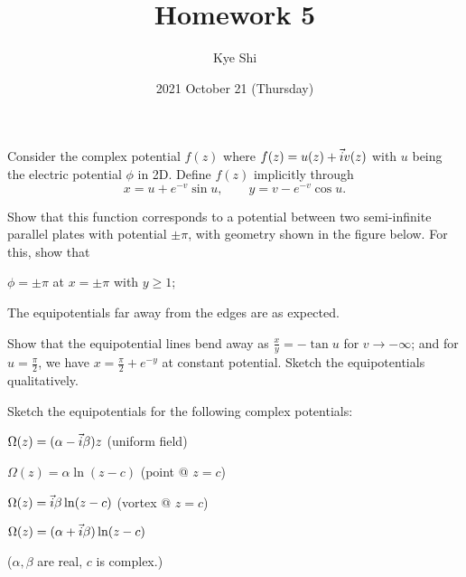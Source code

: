 \documentclass{phys151}
\title{Homework 5}
\date{2021 October 21 (Thursday)}
\author{Kye Shi}
\begin{document}
\begin{problem}
  Consider the complex potential \(f(z)\) where \(f(z) = u(z) + \vec i v(z)\) with
  \(u\) being the electric potential \(\phi\) in 2D.  Define \(f(z)\)
  implicitly through
  \[
    x = u + e^{-v} \sin u, \qquad y = v - e^{-v} \cos u.
  \]
  \begin{subproblems}
  \item Show that this function corresponds to a potential between two
    semi-infinite parallel plates with potential \(\pm\pi\), with geometry
    shown in the figure below.  For this, show that
    \begin{subproblems}
    \item \(\phi = \pm\pi\) at \(x = \pm\pi\) with \(y\ge1\);
    \item The equipotentials far away from the edges are as expected.
    \end{subproblems}
  \item Show that the equipotential lines bend away as \(\frac x y = -\tan
    u\) for \(v \to -\infty\); and for \(u = \frac \pi 2\), we have \(x =
    \frac \pi 2 + e^{-y}\) at constant potential.  Sketch the equipotentials
    qualitatively.
  \end{subproblems}
\end{problem}

\begin{solution}

\end{solution}

\begin{problem}
  Sketch the equipotentials for the following complex potentials:
  \begin{subproblems}
  \item \(\Omega(z) = (\alpha-\vec i\beta) z\) (uniform field)
  \item \(\Omega(z) = \alpha \ln(z-c)\) (point @ \(z=c\))
  \item \(\Omega(z) = \vec i\beta \ln(z-c)\) (vortex @ \(z=c\))
  \item \(\Omega(z) = (\alpha+\vec i\beta) \ln(z-c)\)
  \end{subproblems}
  (\(\alpha, \beta\) are real, \(c\) is complex.)
\end{problem}

\begin{solution}

\end{solution}
\end{document}

